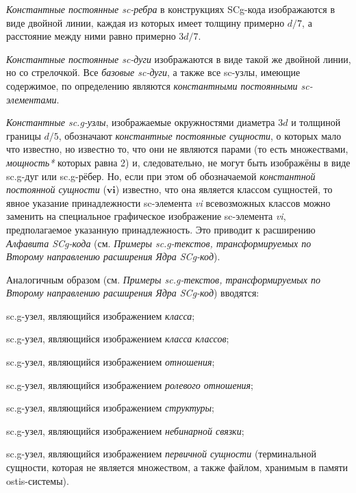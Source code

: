 \begin{textitemize}
	\item \textit{Константные постоянные sc-ребра} в конструкциях SCg-кода изображаются в виде двойной линии, каждая из которых имеет толщину примерно $d/7$, а расстояние между ними равно примерно $3d/7$. 
	\item \textit{Константные постоянные sc-дуги} изображаются в виде такой же двойной линии, но со стрелочкой. Все \textit{базовые sc-дуги}, а также все sc-узлы, имеющие содержимое, по определению являются \textit{константными постоянными sc-элементами}. 
	\item \textit{Константные sc.g-узлы}, изображаемые окружностями диаметра $3d$ и толщиной границы $d/5$, обозначают \textit{константные постоянные сущности}, о которых мало что известно, но известно то, что они не являются парами (то есть множествами, \textit{мощность*} которых равна 2) и, следовательно, не могут быть изображёны в виде sc.g-дуг или sc.g-рёбер. Но, если при этом об обозначаемой \textit{константной постоянной сущности} ($\bm{vi}$) известно, что она является классом сущностей, то явное указание принадлежности sc-элемента \textit{vi} всевозможных классов можно заменить на специальное графическое изображение sc-элемента \textit{vi}, предполагаемое указанную принадлежность. Это приводит к расширению  \textit{Алфавита SCg-кода} (см. \textit{Примеры sc.g-текстов, трансформируемых по Второму направлению расширения Ядра SCg-код}).
\end{textitemize}


Аналогичным образом (см. \textit{Примеры sc.g-текстов, трансформируемых по Второму направлению расширения Ядра SCg-код}) вводятся: 
\begin{textitemize}
	\item sc.g-узел, являющийся изображением \textit{класса};  
	\item sc.g-узел, являющийся изображением \textit{класса классов};  
	\item sc.g-узел, являющийся изображением \textit{отношения}; 
	\item sc.g-узел, являющийся изображением \textit{ролевого отношения}; 
	\item sc.g-узел, являющийся изображением \textit{структуры};  
	\item sc.g-узел, являющийся изображением \textit{небинарной связки};
	\item sc.g-узел, являющийся изображением \textit{первичной сущности} (терминальной сущности, которая не является множеством, а также файлом, хранимым в памяти ostis-системы).
\end{textitemize}

